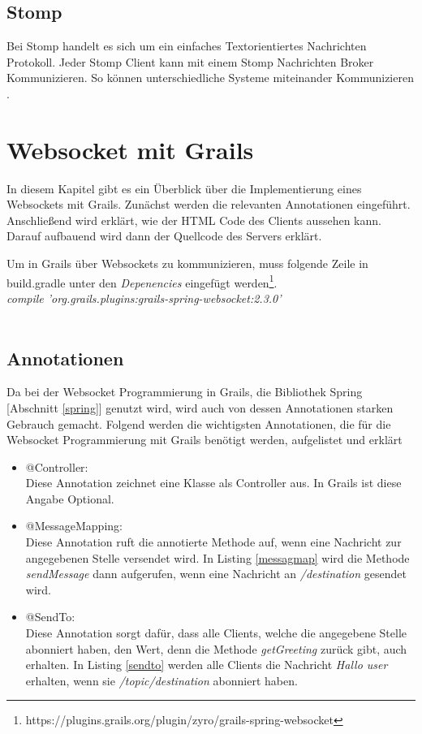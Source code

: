 \subsection{Stomp}

Bei Stomp handelt es sich um ein einfaches Textorientiertes Nachrichten Protokoll. Jeder Stomp Client kann mit einem Stomp Nachrichten Broker Kommunizieren. So können unterschiedliche Systeme miteinander Kommunizieren \cite{stomp}.

\section{Websocket mit Grails}

In diesem Kapitel gibt es ein Überblick über die Implementierung eines Websockets mit Grails. Zunächst werden die relevanten Annotationen eingeführt. Anschließend wird erklärt, wie der HTML Code des Clients aussehen kann. Darauf aufbauend wird dann der Quellcode des Servers erklärt. 

Um in Grails über Websockets zu kommunizieren, muss folgende Zeile in build.gradle unter den \textit{Depenencies} eingefügt werden\footnote{https://plugins.grails.org/plugin/zyro/grails-spring-websocket}.\\
\textit{compile 'org.grails.plugins:grails-spring-websocket:2.3.0'}\\
\\

\subsection{Annotationen}\label{ankapitel}

Da bei der Websocket Programmierung in Grails, die Bibliothek Spring [Abschnitt \ref{spring}] genutzt wird, wird auch von dessen Annotationen starken Gebrauch gemacht. Folgend werden die wichtigsten Annotationen, die für die Websocket Programmierung mit Grails benötigt werden, aufgelistet und erklärt \cite{spring2017}

\begin{itemize}
	\item @Controller:\\	
	Diese Annotation zeichnet eine Klasse als Controller aus. In Grails ist diese Angabe Optional.
	
	\item @MessageMapping:\\
	Diese Annotation ruft die annotierte Methode auf, wenn eine Nachricht zur angegebenen Stelle versendet wird. In Listing \ref{messagmap} wird die Methode \textit{sendMessage} dann aufgerufen, wenn eine Nachricht an \textit{/destination} gesendet wird. 
	   
	\item @SendTo:\\
	Diese Annotation sorgt dafür, dass alle Clients, welche die angegebene Stelle 	abonniert haben, den Wert, denn die Methode \textit{getGreeting} zurück gibt, auch erhalten. In Listing \ref{sendto} werden alle Clients die Nachricht \textit{Hallo user} erhalten, wenn sie \textit{/topic/destination} abonniert haben. 
    
    
\end{itemize} 


